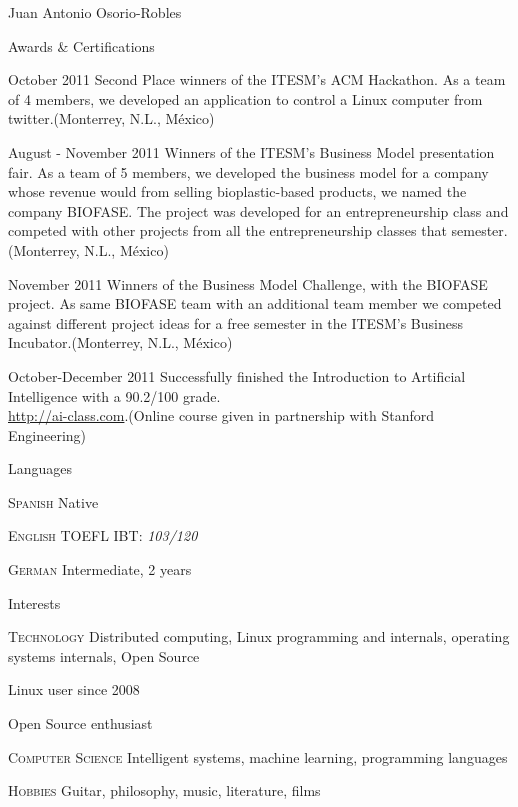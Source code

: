 \documentclass[spanish,10pt,letterpaper]{article}
\begin{document}
\begin{cv}{Juan Antonio Osorio-Robles}
	\begin{cvlist}{Awards \& Certifications}
		\item [October 2011] Second Place winners of the ITESM's ACM Hackathon. As a team of 4 members, we developed an application to control a Linux computer from twitter.(Monterrey, N.L., M\'{e}xico)
		\item [August - November 2011] Winners of the ITESM's Business Model presentation fair. As a team of 5 members, we developed the business model for a company whose revenue would from selling bioplastic-based products, we named the company BIOFASE. The project was developed for an entrepreneurship class and competed with other projects from all the entrepreneurship classes that semester.(Monterrey, N.L., M\'{e}xico)
		\item [November 2011] Winners of the Business Model Challenge, with the BIOFASE project. As same BIOFASE team with an additional team member we competed against different project ideas for a free semester in the ITESM's Business Incubator.(Monterrey, N.L., M\'{e}xico)
		\item [October-December 2011] Successfully finished the Introduction to Artificial Intelligence with a 90.2/100 grade. \\
		\href{http://ai-class.com}{http://ai-class.com}.(Online course given in partnership with Stanford Engineering)
	\end{cvlist}


	\begin{cvlist}{Languages}
		\item [\textsc {Spanish}]
				Native
		\item [\textsc {English}]
				TOEFL IBT: \emph{103/120}
		\item [\textsc {German}]
				Intermediate, 2 years
		\end{cvlist}

	\begin{cvlist}{Interests}
		\item [\textsc {Technology}]
				Distributed computing, Linux programming and internals, operating systems internals, Open Source
		\item [  ] Linux user since 2008
		\item [  ] Open Source enthusiast
		\item [\textsc {Computer Science}]
				Intelligent systems, machine learning, programming languages
		\item [\textsc {Hobbies}]
				Guitar, philosophy, music, literature, films
	\end{cvlist}


\end{cv}
\end{document}
